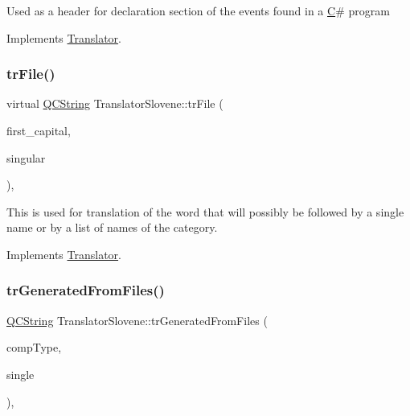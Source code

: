 Used as a header for declaration section of the events found in a \mbox{\hyperlink{class_c}{C}}\# program 

Implements \mbox{\hyperlink{class_translator}{Translator}}.

\mbox{\label{class_translator_slovene_a2703261492b67ea49cb66a03c7169147}} 
\subsubsection{\texorpdfstring{trFile()}{trFile()}}
{\footnotesize\ttfamily virtual \mbox{\hyperlink{class_q_c_string}{Q\+C\+String}} Translator\+Slovene\+::tr\+File (\begin{DoxyParamCaption}\item[{bool}]{first\+\_\+capital,  }\item[{bool}]{singular }\end{DoxyParamCaption})\hspace{0.3cm}{\ttfamily [inline]}, {\ttfamily [virtual]}}

This is used for translation of the word that will possibly be followed by a single name or by a list of names of the category. 

Implements \mbox{\hyperlink{class_translator}{Translator}}.

\mbox{\label{class_translator_slovene_a37891d699740842b4583a8a185140cbc}} 
\subsubsection{\texorpdfstring{trGeneratedFromFiles()}{trGeneratedFromFiles()}}
{\footnotesize\ttfamily \mbox{\hyperlink{class_q_c_string}{Q\+C\+String}} Translator\+Slovene\+::tr\+Generated\+From\+Files (\begin{DoxyParamCaption}\item[{\mbox{\hyperlink{class_class_def_ae70cf86d35fe954a94c566fbcfc87939}{Class\+Def\+::\+Compound\+Type}}}]{comp\+Type,  }\item[{bool}]{single }\end{DoxyParamCaption})\hspace{0.3cm}{\ttfamily [inline]}, {\ttfamily [virtual]}}

